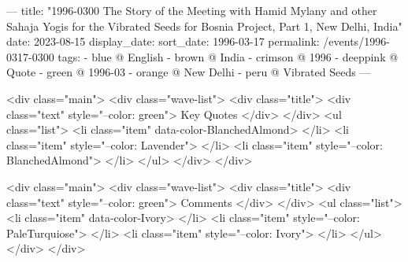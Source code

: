 ---
title: "1996-0300 The Story of the Meeting with Hamid Mylany and other Sahaja Yogis for the Vibrated Seeds for Bosnia Project, Part 1, New Delhi, India"
date: 2023-08-15
display_date: 
sort_date: 1996-03-17
permalink: /events/1996-0317-0300
tags:
  - blue @ English
  - brown @ India
  - crimson @ 1996
  - deeppink @ Quote
  - green @ 1996-03
  - orange @ New Delhi
  - peru @ Vibrated Seeds
---

<div class="main">
  <div class="wave-list">
    <div class="title">
      <div class="text" style="--color: green">
        Key Quotes
      </div>
    </div>
    <ul class="list">
        <li class="item" data-color-BlanchedAlmond>
        </li>
        <li class="item" style="--color: Lavender">
        </li>
        <li class="item" style="--color: BlanchedAlmond">
        </li>
      </ul>
  </div>
</div>

<div class="main">
  <div class="wave-list">
    <div class="title">
      <div class="text" style="--color: green">
        Comments
      </div>
    </div>
    <ul class="list">
        <li class="item" data-color-Ivory>
        </li>
        <li class="item" style="--color: PaleTurquiose">
        </li>
        <li class="item" style="--color: Ivory">
        </li>
      </ul>
  </div>
</div>